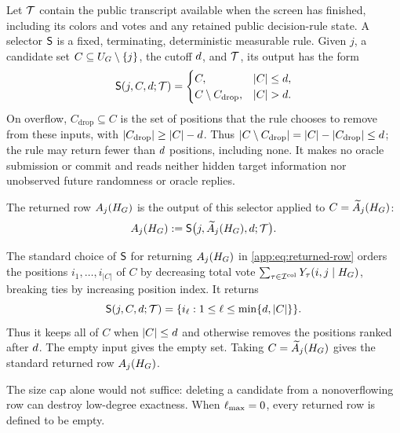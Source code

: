 \begin{definition}
\label{app:def:row-selector}
Let $\mathcal T$ contain the public transcript available when the
screen has finished, including its colors and votes and any retained public
decision-rule state.  A selector $\mathsf S$ is a fixed, terminating,
deterministic measurable rule.  Given $j$, a candidate set
$C\subseteq U_{G}\setminus\{j\}$, the cutoff $d$,
and $\mathcal T$, its output has the form
\[
 \RowSelector(j,C,\DegreeCutoff;\ScreenTranscript)
 =
 \begin{cases}
 C,&|C|\le\DegreeCutoff,\\
 C\setminus C_{\mathrm{drop}},&|C|>\DegreeCutoff.
 \end{cases}
\]
On overflow, $C_{\mathrm{drop}}\subseteq C$ is the set of positions that
the rule chooses to remove from these inputs, with
$|C_{\mathrm{drop}}|\ge |C|-d$. Thus
$|C\setminus C_{\mathrm{drop}}|=|C|-|C_{\mathrm{drop}}|\le d$;
the rule may return fewer than $d$ positions, including none.
It makes no oracle submission or commit and reads neither hidden target
information nor unobserved future randomness or oracle replies.
\end{definition}

The returned row $A_{j}(H_{G})$ is the output of this selector applied
to $C=\widetilde A_{j}(H_{G})$:
\begin{equation}
 A_{j}(H_{G})
 :=\mathsf S\bigl(j,\widetilde A_{j}(H_{G}),d;
                     \mathcal T\bigr).
 \label{app:eq:returned-row}
\end{equation}
\begin{example*}
The standard choice of $\mathsf S$ for returning $A_{j}(H_{G})$ in
\eqref{app:eq:returned-row} orders the positions
$i_1,\ldots,i_{|C|}$ of $C$ by decreasing total vote
$\sum_{\tau\in\mathcal I^{\mathrm{col}}}Y_{\tau}(i,j\mid H_{G})$, breaking ties
by increasing position index. It returns
\[
 \mathsf S(j,C,d;\mathcal T)
 =\{i_\ell:1\le\ell\le\min\{d,|C|\}\}.
\]
Thus it keeps all of $C$ when $|C|\le d$ and otherwise removes
the positions ranked after $d$. The empty input gives the
empty set. Taking $C=\widetilde A_{j}(H_{G})$ gives the standard returned row
$A_{j}(H_{G})$.
\end{example*}
The size cap alone would not suffice: deleting a candidate from a
nonoverflowing row can destroy low-degree exactness.
When $\ell_{\max}=0$, every returned row is defined to be empty.

